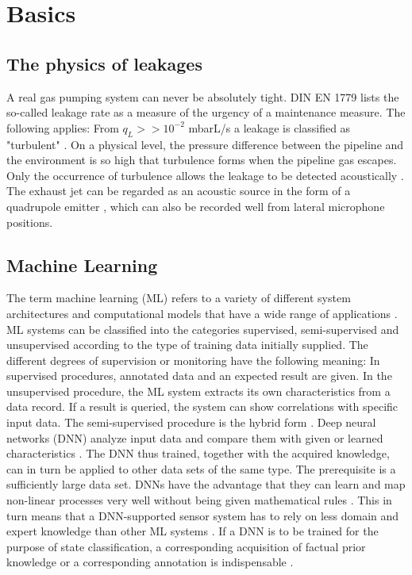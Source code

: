 \documentclass[a4paper,12pt]{article}
\begin{document}
\section{Basics}
\subsection{The physics of leakages}

A real gas pumping system can never be absolutely tight. DIN EN 1779 lists the so-called leakage rate as a measure of the urgency of a maintenance measure. The following applies: From $q_L > >10^{-2}$ mbarL/s a leakage is classified as "turbulent" \cite{1779}. On a physical level, the pressure difference between the pipeline and the environment is so high that turbulence forms when the pipeline gas escapes. Only the occurrence of turbulence allows the leakage to be detected acoustically \cite{Genuit.2010}. The exhaust jet can be regarded as an acoustic source in the form of a quadrupole emitter \cite{Zeller.2018}, which can also be recorded well from lateral microphone positions.

\subsection{Machine Learning}
The term machine learning (ML) refers to a variety of different system architectures and computational models that have a wide range of applications \cite{FHG.2018}. ML systems can be classified into the categories supervised, semi-supervised and unsupervised according to the type of training data initially supplied. The different degrees of supervision or monitoring have the following meaning: In supervised procedures, annotated data and an expected result are given. In the unsupervised procedure, the ML system extracts its own characteristics from a data record. If a result is queried, the system can show correlations with specific input data. The semi-supervised procedure is the hybrid form \cite{Bishop.2009}.
Deep neural networks (DNN) analyze input data and compare them with given or learned characteristics \cite{FHG.2018}. The DNN thus trained, together with the acquired knowledge, can in turn be applied to other data sets of the same type. The prerequisite is a sufficiently large data set. 
DNNs have the advantage that they can learn and map non-linear processes very well without being given mathematical rules \cite{ZHANG.2004}. This in turn means that a DNN-supported sensor system has to rely on less domain and expert knowledge than other ML systems \cite{FHG.2018}. If a DNN is to be trained for the purpose of state classification, a corresponding acquisition of factual prior knowledge or a corresponding annotation is indispensable \cite{ltu.luscha}. 
\end{document}
